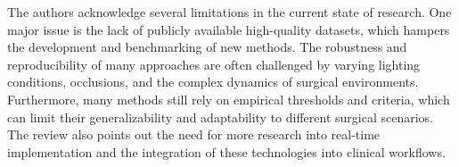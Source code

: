 The authors acknowledge several limitations in the current state of research. One major issue is the lack of publicly available high-quality datasets, which hampers the development and benchmarking of new methods. The robustness and reproducibility of many approaches are often challenged by varying lighting conditions, occlusions, and the complex dynamics of surgical environments. Furthermore, many methods still rely on empirical thresholds and criteria, which can limit their generalizability and adaptability to different surgical scenarios. The review also points out the need for more research into real-time implementation and the integration of these technologies into clinical workflows. 






